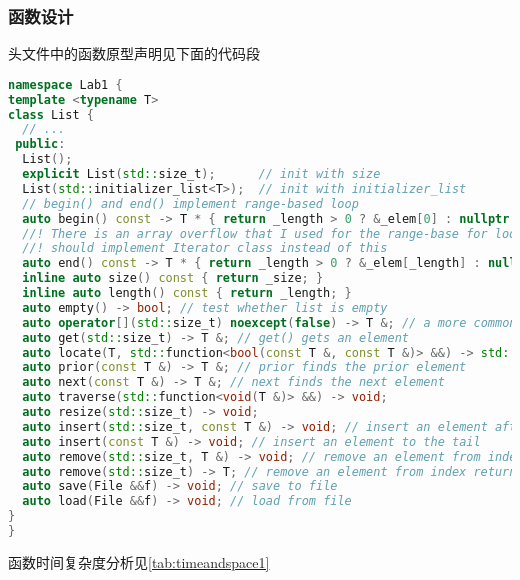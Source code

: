 \subsubsection{函数设计}
头文件中的函数原型声明见下面的代码段
\begin{lstlisting}[language=c++,float,floatplacement=h]
namespace Lab1 {
template <typename T>
class List {
  // ...
 public:
  List();
  explicit List(std::size_t);      // init with size
  List(std::initializer_list<T>);  // init with initializer_list
  // begin() and end() implement range-based loop
  auto begin() const -> T * { return _length > 0 ? &_elem[0] : nullptr; }
  //! There is an array overflow that I used for the range-base for loop
  //! should implement Iterator class instead of this
  auto end() const -> T * { return _length > 0 ? &_elem[_length] : nullptr; }
  inline auto size() const { return _size; }
  inline auto length() const { return _length; }
  auto empty() -> bool; // test whether list is empty
  auto operator[](std::size_t) noexcept(false) -> T &; // a more common way to get and set elements
  auto get(std::size_t) -> T &; // get() gets an element
  auto locate(T, std::function<bool(const T &, const T &)> &&) -> std::size_t; // locate() finds an element
  auto prior(const T &) -> T &; // prior finds the prior element
  auto next(const T &) -> T &; // next finds the next element
  auto traverse(std::function<void(T &)> &&) -> void;
  auto resize(std::size_t) -> void;
  auto insert(std::size_t, const T &) -> void; // insert an element after the index
  auto insert(const T &) -> void; // insert an element to the tail
  auto remove(std::size_t, T &) -> void; // remove an element from index, returning by param
  auto remove(std::size_t) -> T; // remove an element from index returning by return value
  auto save(File &&f) -> void; // save to file
  auto load(File &&f) -> void; // load from file
}
}
\end{lstlisting}\label{code:header1}
\par
函数时间复杂度分析见\autoref{tab:timeandspace1}
